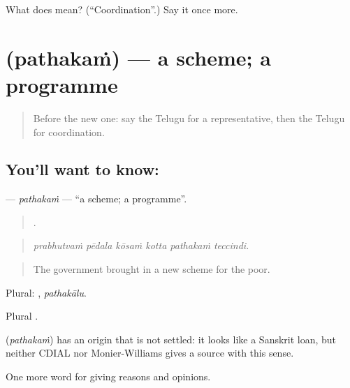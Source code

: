 \begin{tcolorbox}[breakable,colback=teal!4,colframe=teal!35!black,title={Before you move on}]
What does  mean? (\textquotedblleft{}Coordination\textquotedblright{}.) Say it once more.
\end{tcolorbox}
\section[\texorpdfstring{\te{పథకం} (pathakaṁ)}{పథకం (pathakaṁ)}]{ (pathakaṁ) — a scheme; a programme}

\label{lesson:TE-C403-pathakam}



\begin{quote}
Before the new one: say the Telugu for a representative, then the Telugu for coordination.
\end{quote}

\subsection*{You'll want to know: }
\textbf{} — \emph{pathakaṁ} — \textquotedblleft{}a scheme; a programme\textquotedblright{}.

\begin{quote}
     .
\end{quote}

\begin{quote}
\emph{prabhutvaṁ pēdala kōsaṁ kotta pathakaṁ teccindi.}
\end{quote}

\begin{quote}
The government brought in a new scheme for the poor.
\end{quote}

Plural: , \emph{pathakālu}.

Plural .

\begin{cousinweb}
\textbf{} (\emph{pathakaṁ}) has an origin that is not settled: it looks like a Sanskrit loan, but neither CDIAL nor Monier-Williams gives a source with this sense.
\end{cousinweb}

\begin{grammarlens}[title={What you've built}]
One more word for giving reasons and opinions.
\end{grammarlens}

